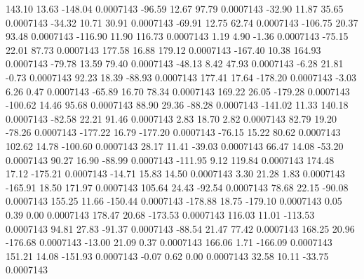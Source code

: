       143.10       13.63     -148.04     0.0007143
      -96.59       12.67       97.79     0.0007143
      -32.90       11.87       35.65     0.0007143
      -34.32       10.71       30.91     0.0007143
      -69.91       12.75       62.74     0.0007143
     -106.75       20.37       93.48     0.0007143
     -116.90       11.90      116.73     0.0007143
        1.19        4.90       -1.36     0.0007143
      -75.15       22.01       87.73     0.0007143
      177.58       16.88      179.12     0.0007143
     -167.40       10.38      164.93     0.0007143
      -79.78       13.59       79.40     0.0007143
      -48.13        8.42       47.93     0.0007143
       -6.28       21.81       -0.73     0.0007143
       92.23       18.39      -88.93     0.0007143
      177.41       17.64     -178.20     0.0007143
       -3.03        6.26        0.47     0.0007143
      -65.89       16.70       78.34     0.0007143
      169.22       26.05     -179.28     0.0007143
     -100.62       14.46       95.68     0.0007143
       88.90       29.36      -88.28     0.0007143
     -141.02       11.33      140.18     0.0007143
      -82.58       22.21       91.46     0.0007143
        2.83       18.70        2.82     0.0007143
       82.79       19.20      -78.26     0.0007143
     -177.22       16.79     -177.20     0.0007143
      -76.15       15.22       80.62     0.0007143
      102.62       14.78     -100.60     0.0007143
       28.17       11.41      -39.03     0.0007143
       66.47       14.08      -53.20     0.0007143
       90.27       16.90      -88.99     0.0007143
     -111.95        9.12      119.84     0.0007143
      174.48       17.12     -175.21     0.0007143
      -14.71       15.83       14.50     0.0007143
        3.30       21.28        1.83     0.0007143
     -165.91       18.50      171.97     0.0007143
      105.64       24.43      -92.54     0.0007143
       78.68       22.15      -90.08     0.0007143
      155.25       11.66     -150.44     0.0007143
     -178.88       18.75     -179.10     0.0007143
        0.05        0.39        0.00     0.0007143
      178.47       20.68     -173.53     0.0007143
      116.03       11.01     -113.53     0.0007143
       94.81       27.83      -91.37     0.0007143
      -88.54       21.47       77.42     0.0007143
      168.25       20.96     -176.68     0.0007143
      -13.00       21.09        0.37     0.0007143
      166.06        1.71     -166.09     0.0007143
      151.21       14.08     -151.93     0.0007143
       -0.07        0.62        0.00     0.0007143
       32.58       10.11      -33.75     0.0007143
